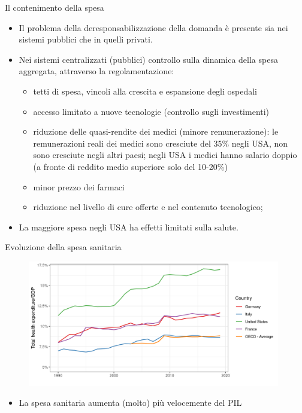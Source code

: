 \documentclass[aspectratio=64,12pt]{beamer}
\begin{document}
\begin{frame}{Il contenimento della spesa}
\begin{itemize}
\item Il problema della deresponsabilizzazione della domanda è presente
sia nei sistemi pubblici che in quelli privati.
\item Nei sistemi centralizzati (pubblici) controllo sulla dinamica della
  spesa aggregata, attraverso la regolamentazione:
\begin{itemize}
\item tetti di spesa, vincoli alla crescita e espansione degli ospedali
\item accesso limitato a nuove tecnologie (controllo sugli investimenti)
\item riduzione delle quasi-rendite dei medici (minore remunerazione):
le remunerazioni reali dei medici sono cresciute del 35\% negli USA,
non sono cresciute negli altri paesi; negli USA i medici hanno
salario doppio (a fronte di reddito medio superiore solo del 10-20\%)
\item minor prezzo dei farmaci
\item riduzione nel livello di cure offerte e nel contenuto
tecnologico;
\end{itemize}
\item La maggiore spesa negli USA ha effetti limitati sulla salute.
\end{itemize}
\end{frame}


\begin{frame}{Evoluzione della spesa sanitaria}
\begin{figure}[htbp]
\centering
\includegraphics[height=5.5cm]{./figure/health-expenditure-growth-OECD.png}
\end{figure}

\begin{itemize}
\item La spesa sanitaria aumenta (molto) più velocemente del PIL
\end{itemize}
\end{frame}
\end{document}
